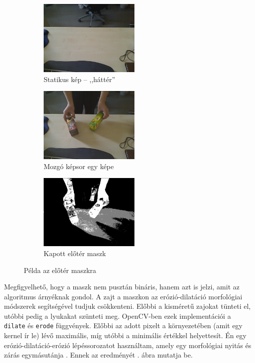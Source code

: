 \begin{figure}[tbh]
\centering
\begin{subfigure}[b]{.32\linewidth}
	\centering
	\includegraphics[width=137pt]{figures/image230.png}
	\caption{Statikus kép -- ,,háttér''}
  \end{subfigure}
\begin{subfigure}[b]{.32\linewidth}
	\centering
	\includegraphics[width=137pt]{figures/image343.png}
	\caption{Mozgó képsor egy képe}
  \end{subfigure}
\begin{subfigure}[b]{.32\linewidth}
	\centering
	\includegraphics[width=137pt]{figures/mask343.png}
	\caption{Kapott előtér maszk}
  \end{subfigure}
\caption{Példa az előtér maszkra \label{fig:my_mog2}}
\end{figure}

Megfigyelhető, hogy a maszk nem pusztán bináris, hanem azt is jelzi, amit az algoritmus árnyéknak gondol. A zajt a maszkon az erózió-dilatáció morfológiai módszerek segítségével tudjuk csökkenteni. Előbbi a kisméretű zajokat tünteti el, utóbbi pedig a lyukakat szünteti meg. OpenCV-ben ezek implementációi a \texttt{dilate} és \texttt{erode} függvények. Előbbi az adott pixelt a környezetében (amit egy kernel ír le) lévő maximális, míg utóbbi a minimális értékkel helyettesít. Én egy erózió-dilatáció-erózió lépéssorozatot használtam, amely egy morfológiai nyitás és zárás egymásutánja \cite{kepfeldolg-modszerek}. Ennek az eredményét . ábra mutatja be.

